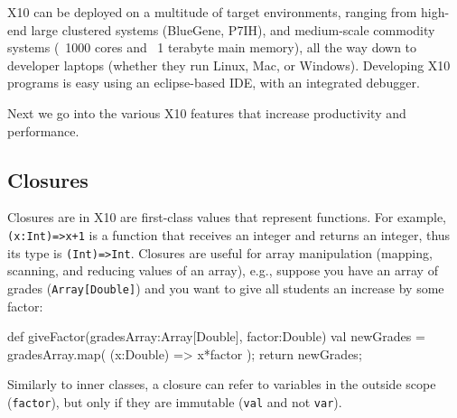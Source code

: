 \documentclass[a4paper]{article}
\def\codesmaller{\small}
\newcommand{\code}[1]{\texttt{\textup{\codesmaller #1}}}
\begin{document}
X10 can be deployed on a multitude of target environments,
    ranging from high-end large clustered systems (BlueGene, P7IH),
    and medium-scale commodity systems (~1000 cores and ~1 terabyte main memory),
    all the way down to developer laptops (whether they run Linux, Mac, or Windows).
Developing X10 programs is easy using an eclipse-based IDE, with an integrated debugger.

Next we go into the various X10 features that increase productivity and performance.

\subsection{Closures}
Closures are in X10 are first-class values that represent functions.
For example, \code{(x:Int)=>x+1} is a function that receives an integer and returns an integer,
    thus its type is \code{(Int)=>Int}.
Closures are useful for array manipulation (mapping, scanning, and reducing values of an array),
    e.g., suppose you have an array of grades (\code{Array[Double]}) and you want to give all students
        an increase by some factor:
\begin{xten}
def giveFactor(gradesArray:Array[Double], factor:Double) {
  val newGrades = gradesArray.map( (x:Double) => x*factor );
  return newGrades;
}
\end{xten}
Similarly to inner classes, a closure can refer to variables in the outside scope (\code{factor}),
    but only if they are immutable (\code{val} and not \code{var}).
\end{document}
